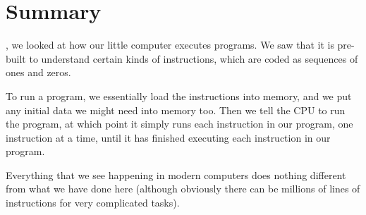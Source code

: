 \documentclass[../../../main.tex]{subfiles}
\begin{document}
\section{Summary}

, we looked at how our little computer executes programs. We saw that it is pre-built to understand certain kinds of instructions, which are coded as sequences of ones and zeros.

To run a program, we essentially load the instructions into memory, and we put any initial data we might need into memory too. Then we tell the CPU to run the program, at which point it simply runs each instruction in our program, one instruction at a time, until it has finished executing each instruction in our program. 

Everything that we see happening in modern computers does nothing different from what we have done here (although obviously there can be millions of lines of instructions for very complicated tasks). 
\end{document}
